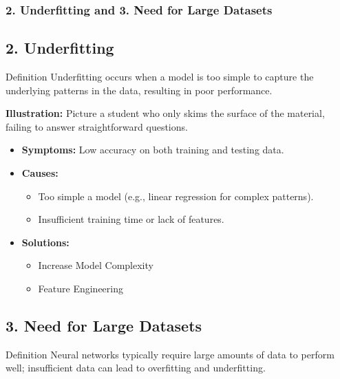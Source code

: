 \documentclass{beamer}
\begin{document}
\begin{frame}[fragile]
    \frametitle{2. Underfitting and 3. Need for Large Datasets}
    
    \subsection{2. Underfitting}
    \begin{block}{Definition}
        Underfitting occurs when a model is too simple to capture the underlying patterns in the data, resulting in poor performance.
    \end{block}
    
    \textbf{Illustration:} Picture a student who only skims the surface of the material, failing to answer straightforward questions.

    \begin{itemize}
        \item \textbf{Symptoms:} Low accuracy on both training and testing data.
        \item \textbf{Causes:}
        \begin{itemize}
            \item Too simple a model (e.g., linear regression for complex patterns).
            \item Insufficient training time or lack of features.
        \end{itemize}
        \item \textbf{Solutions:}
        \begin{itemize}
            \item Increase Model Complexity 
            \item Feature Engineering
        \end{itemize}
    \end{itemize}
    
    \bigskip
    
    \subsection{3. Need for Large Datasets}
    \begin{block}{Definition}
        Neural networks typically require large amounts of data to perform well; insufficient data can lead to overfitting and underfitting.
    \end{block}
    

\end{frame}
\end{document}
